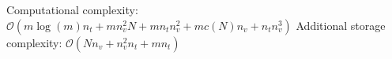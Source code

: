 Computational complexity: $\mathcal{O}(m \log(m) n_t + m n_v^2 N + m n_t n_v^2 +  m c(N) n_v + n_t n_v^3)$
Additional storage complexity: $\mathcal{O}(N n_v + n_v^2 n_t + m n_t)$


